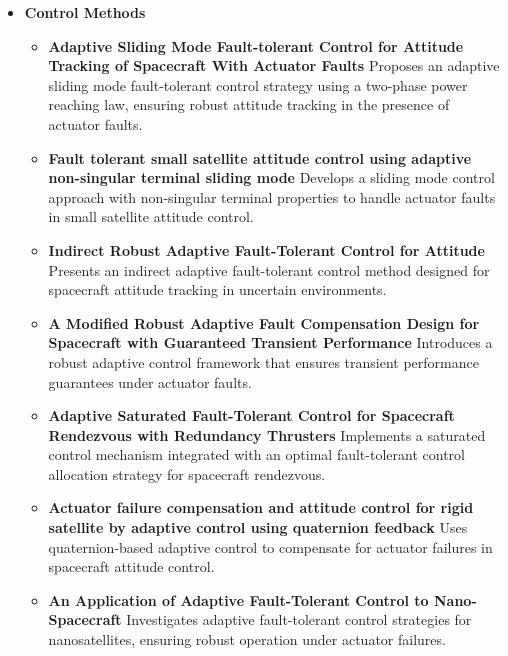 \begin{itemize}
    \item \textbf{Control Methods}
    \begin{itemize}
        \item \textbf{Adaptive Sliding Mode Fault-tolerant Control for Attitude Tracking of Spacecraft With Actuator Faults} \cite{Yang2023AdaptiveFaults} Proposes an adaptive sliding mode fault-tolerant control strategy using a two-phase power reaching law, ensuring robust attitude tracking in the presence of actuator faults.
        \item \textbf{Fault tolerant small satellite attitude control using adaptive non-singular terminal sliding mode} \cite{Cao2013FaultMode} Develops a sliding mode control approach with non-singular terminal properties to handle actuator faults in small satellite attitude control.
        \item \textbf{Indirect Robust Adaptive Fault-Tolerant Control for Attitude} \cite{Cai2008IndirectSpacecraft} Presents an indirect adaptive fault-tolerant control method designed for spacecraft attitude tracking in uncertain environments.
        \item \textbf{A Modified Robust Adaptive Fault Compensation Design for Spacecraft with Guaranteed Transient Performance} \cite{Yao2023APerformance} Introduces a robust adaptive control framework that ensures transient performance guarantees under actuator faults.
        \item \textbf{Adaptive Saturated Fault-Tolerant Control for Spacecraft Rendezvous with Redundancy Thrusters} \cite{Xia2021AdaptiveThrusters} Implements a saturated control mechanism integrated with an optimal fault-tolerant control allocation strategy for spacecraft rendezvous.
        \item \textbf{Actuator failure compensation and attitude control for rigid satellite by adaptive control using quaternion feedback} \cite{Ma2014ActuatorFeedback} Uses quaternion-based adaptive control to compensate for actuator failures in spacecraft attitude control.
        \item \textbf{An Application of Adaptive Fault-Tolerant Control to Nano-Spacecraft} \cite{Biggs2014AnNano-Spacecraft} Investigates adaptive fault-tolerant control strategies for nanosatellites, ensuring robust operation under actuator failures.
    \end{itemize}


\end{itemize}
